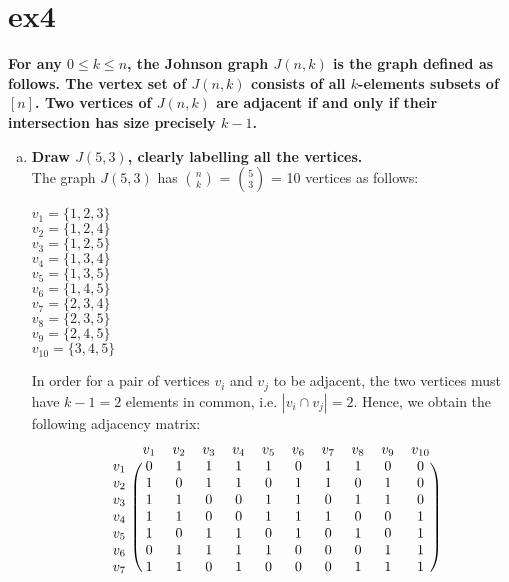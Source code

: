 \section{ex4}
\boldmath
\textbf{For any $0 \leq k \leq n$, the Johnson graph $J(n, k)$ is the graph defined as follows. The vertex set of
$J(n, k)$ consists of all $k$-elements subsets of $[n]$. Two vertices of $J(n, k)$ are adjacent if and only
if their intersection has size precisely $k-1$.} 
\unboldmath
\begin{enumerate}[a)]
    \item \textbf{Draw $J(5, 3)$, clearly labelling all the vertices.} \\
    \linebreak 
    The graph $J(5,3)$ has $\binom{n}{k}$ = $\binom{5}{3}$ = 10 vertices as follows: 
    \begin{multicols}{2}
    $v_1 = \{1, 2, 3\}$ \\
    $v_2 = \{1, 2, 4\}$ \\
    $v_3 = \{1, 2, 5\}$ \\
    $v_4 = \{1, 3, 4\}$ \\
    $v_5 = \{1, 3, 5\}$ \\
    $v_6 = \{1, 4, 5\}$ \\
    $v_7 = \{2, 3, 4\}$ \\
    $v_8 = \{2, 3, 5\}$ \\
    $v_9 = \{2, 4, 5\}$ \\
    $v_{10} = \{3, 4, 5\}$ 
    \end{multicols}
    In order for a pair of vertices $v_i$ and $v_j$ to be adjacent, the two vertices must have $k-1 = 2$ elements in common, i.e. $|v_i \cap v_j| = 2$. Hence, we obtain the following adjacency matrix:
    \[
\begin{blockarray}{ccccccccccc}
& v_1 & v_2 & v_3 & v_4 & v_5 & v_6 & v_7 & v_8 & v_9 & v_{10}\\
\begin{block}{c(cccccccccc)}
  v_1 & 0 & 1 & 1 & 1 & 1 & 0 & 1 & 1 & 0 & 0 \\
  v_2 & 1 & 0 & 1 & 1 & 0 & 1 & 1 & 0 & 1 & 0 \\
  v_3 & 1 & 1 & 0 & 0 & 1 & 1 & 0 & 1 & 1 & 0 \\
  v_4 & 1 & 1 & 0 & 0 & 1 & 1 & 1 & 0 & 0 & 1 \\
  v_5 & 1 & 0 & 1 & 1 & 0 & 1 & 0 & 1 & 0 & 1 \\
  v_6 & 0 & 1 & 1 & 1 & 1 & 0 & 0 & 0 & 1 & 1 \\
  v_7 & 1 & 1 & 0 & 1 & 0 & 0 & 0 & 1 & 1 & 1 \\

\end{block}
\end{blockarray}\]
\end{enumerate}

